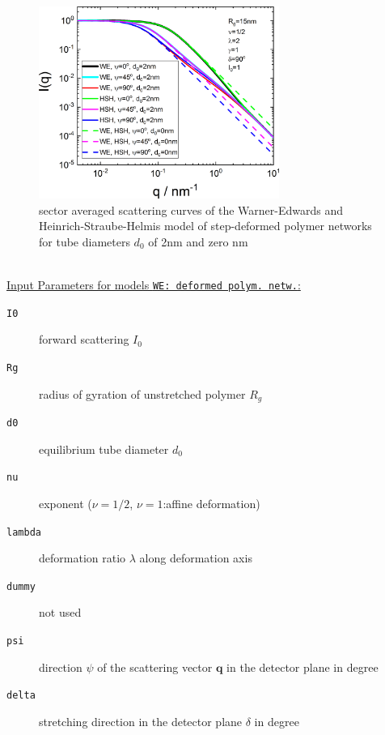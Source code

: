 \begin{figure}[htb]
\begin{center}
\includegraphics[width=0.7\textwidth]{../images/form_factor/deformed_sheared/deformed_polymer_network_I(sector).png}
\end{center}
\caption{sector averaged scattering curves of the Warner-Edwards and Heinrich-Straube-Helmis model of step-deformed polymer networks for tube diameters $d_0$ of 2nm and zero nm}
\label{fig:I(sector)polymernetwork}
\end{figure}

\hspace{1pt}\\
\underline{Input Parameters for models \texttt{WE: deformed polym. netw.}:}\\
\begin{description}
\item[\texttt{I0}] forward scattering $I_0$
\item[\texttt{Rg}] radius of gyration of unstretched polymer $R_g$
\item[\texttt{d0}] equilibrium tube diameter $d_0$
\item[\texttt{nu}] exponent ($\nu=1/2$, $\nu=1$:affine deformation)
\item[\texttt{lambda}] deformation ratio $\lambda$ along deformation axis
\item[\texttt{dummy}] not used
\item[\texttt{psi}] direction $\psi$ of the scattering vector $\mathbf{q}$ in the detector plane in degree
\item[\texttt{delta}] stretching direction in the detector plane $\delta$ in degree
\end{description}

